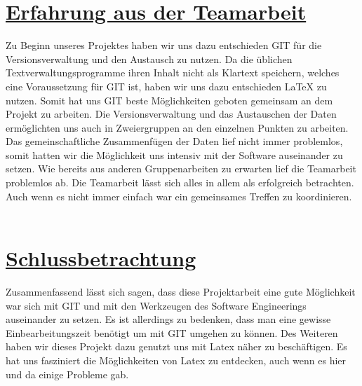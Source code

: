 \documentclass[a4paper]{article}
\begin{document}
\newpage	
\printglossary[title={Glossar}, numberedsection]


\newpage		
\section{\underline{Erfahrung aus der Teamarbeit}}

Zu Beginn unseres Projektes haben wir uns dazu entschieden GIT für die Versionsverwaltung und den Austausch zu nutzen. Da die üblichen Textverwaltungsprogramme ihren Inhalt nicht als Klartext speichern, welches eine Voraussetzung für GIT ist, haben wir uns dazu entschieden LaTeX zu nutzen. Somit hat uns GIT beste Möglichkeiten geboten gemeinsam an dem Projekt zu arbeiten. Die Versionsverwaltung und das Austauschen der Daten ermöglichten uns auch in Zweiergruppen an den einzelnen Punkten zu arbeiten. Das gemeinschaftliche Zusammenfügen der Daten lief nicht immer problemlos, somit hatten wir die Möglichkeit uns intensiv mit der Software auseinander zu setzen. Wie bereits aus anderen Gruppenarbeiten zu erwarten lief die Teamarbeit problemlos ab. 
Die Teamarbeit lässt sich alles in allem als erfolgreich betrachten. Auch wenn es nicht immer einfach war ein gemeinsames Treffen zu koordinieren. 
\\\\

\section{\underline{Schlussbetrachtung}}
	
Zusammenfassend lässt sich sagen, dass diese Projektarbeit eine gute Möglichkeit war sich mit GIT und mit den Werkzeugen des Software Engineerings auseinander zu setzen. Es ist allerdings zu bedenken, dass man eine gewisse Einbearbeitungszeit benötigt um mit GIT umgehen zu können. Des Weiteren haben wir dieses Projekt dazu genutzt uns mit Latex näher zu beschäftigen. Es hat uns fasziniert die Möglichkeiten von Latex zu entdecken, auch wenn es hier und da einige Probleme gab.\\
\end{document}
